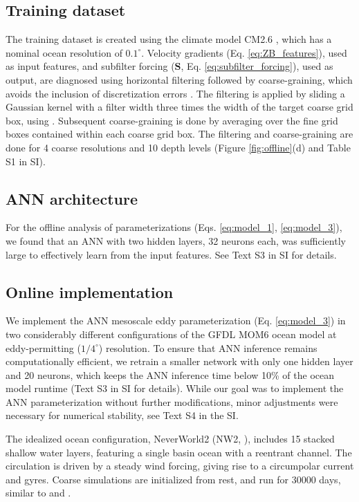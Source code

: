 \documentclass[draft]{agujournal2019}
\begin{document}
\subsection{Training dataset}
The training dataset is created using the climate model CM2.6 \cite{griffies2015impacts}, which has a nominal ocean resolution of $0.1^\circ$.
Velocity gradients (Eq. \eqref{eq:ZB_features}), used as input features, and subfilter forcing ($\mathbf{S}$, Eq. \eqref{eq:subfilter_forcing}), used as output, are diagnosed using horizontal filtering followed by coarse-graining, which avoids the inclusion of discretization errors \cite{guillaumin2021stochastic,christensen2022parametrization,agdestein2025discretize}.
The filtering is applied by sliding a Gaussian kernel with a filter width three times the width of the target coarse grid box, using . Subsequent coarse-graining is done by averaging over the fine grid boxes contained within each coarse grid box. 
The filtering and coarse-graining are done for 4 coarse resolutions and 10 depth levels (Figure \ref{fig:offline}(d) and Table S1 in SI). 

\subsection{ANN architecture}
For the offline analysis of parameterizations (Eqs. \eqref{eq:model_1}, \eqref{eq:model_3}), we found that an ANN with two hidden layers, 32 neurons each, was sufficiently large to effectively learn from the input features. See Text S3 in SI for details. 

\subsection{Online implementation} \label{sec:online_implementation}
We implement the ANN mesoscale eddy parameterization (Eq. \eqref{eq:model_3}) in two considerably different configurations of the GFDL MOM6 ocean model \cite{adcroft2019gfdl} at eddy-permitting ($1/4^\circ$) resolution. To ensure that ANN inference remains computationally efficient, we retrain a smaller network with only one hidden layer and 20 neurons, which keeps the ANN inference time below 10\% of the ocean model runtime (Text S3 in SI for details). While our goal was to implement the ANN parameterization without further modifications, minor adjustments were necessary for numerical stability, see Text S4 in the SI.

The idealized ocean configuration, NeverWorld2 (NW2, ), includes 15 stacked shallow water layers, featuring a single basin ocean with a reentrant channel. The circulation is driven by a steady wind forcing, giving rise to a circumpolar current and gyres. Coarse simulations are initialized from rest, and run for $30000$ days, similar to  and .
\end{document}
